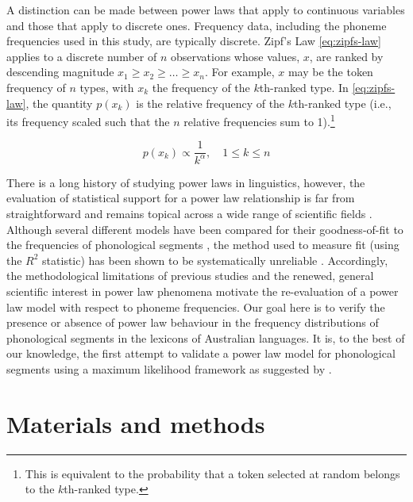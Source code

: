 A distinction can be made between power laws that apply to continuous variables and those that apply to discrete ones. Frequency data, including the phoneme frequencies used in this study, are typically discrete. Zipf's Law \eqref{eq:zipfs-law} applies to a discrete number of \(n\) observations whose values, \(x\), are ranked by descending magnitude \(x_1 \geq x_2 \geq \ldots \geq x_n\). For example, \(x\) may be the token frequency of \(n\) types, with \(x_k\) the frequency of the \(k\)th-ranked type. In \eqref{eq:zipfs-law}, the quantity \(p(x_k)\) is the relative frequency of the \(k\)th-ranked type (i.e., its frequency scaled such that the \(n\) relative frequencies sum to 1).\footnote{This is equivalent to the probability that a token selected at random belongs to the \(k\)th-ranked type.}

\begin{equation}
p(x_k) \propto \frac{1}{k^{\alpha}},\quad 1 \leq k \leq n
\label{eq:zipfs-law}
\end{equation}

There is a long history of studying power laws in linguistics, however, the evaluation of statistical support for a power law relationship is far from straightforward and remains topical across a wide range of scientific fields \autocite{stumpf_critical_2012}. Although several different models have been compared for their goodness-of-fit to the frequencies of phonological segments \autocites{martindale_comparison_1996}{tambovtsev_phoneme_2007}, the method used to measure fit (using the \(R^2\) statistic) has been shown to be systematically unreliable \autocite{clauset_power-law_2009}. Accordingly, the methodological limitations of previous studies and the renewed, general scientific interest in power law phenomena motivate the re-evaluation of a power law model with respect to phoneme frequencies. Our goal here is to verify the presence or absence of power law behaviour in the frequency distributions of phonological segments in the lexicons of Australian languages. It is, to the best of our knowledge, the first attempt to validate a power law model for phonological segments using a maximum likelihood framework as suggested by \textcite{clauset_power-law_2009}.

\hypertarget{phon-freq-methodology}{%
\section{Materials and methods}\label{phon-freq-methodology}}

